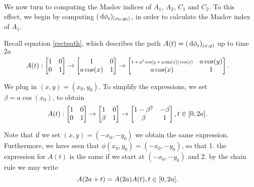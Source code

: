 We now turn to computing the Maslov indices of $A_1$, $A_2$, $C_1$ and $C_2$. To this effect, we begin by computing $(\dl \phi_t)_{(x_0,y_0)}$, in order to calculate the Maslov index of $A_1$.

Recall equation \eqref{rectpath}, which describes the path $A(t) = (\dl \phi_t)_{(x,y)}$ up to time $2a$
\begin{equation}\label{rectpath}
A(t) :
\begin{bmatrix}
1 & 0\\
0 & 1
\end{bmatrix}
\to
\begin{bmatrix}
1 & 0\\
a \cos(x) & 1
\end{bmatrix}
\to
\begin{bmatrix}
\scalebox{0.7}{$1+ a^2 \cos(y+a \sin(x)) \cos(x)$} &  a \cos(y)\\
a \cos(x) & 1
\end{bmatrix}.
\end{equation}

We plug in $(x,y) = (x_0, y_0)$. To simplify the expressions, we set $\beta = a \cos(x_0)$, to obtain
\begin{equation}
A(t) :
\begin{bmatrix}
1 & 0\\
0 & 1
\end{bmatrix}
\to
\begin{bmatrix}
1 & 0\\
\beta & 1
\end{bmatrix}
\to
\begin{bmatrix}
1 - \beta^2 &  -\beta \\
\beta & 1
\end{bmatrix}, t \in \interval 0 {2a}.
\end{equation}

Note that if we set $(x,y) = (-x_0, -y_0)$ we obtain the same expression. Furthermore, we have seen that $\phi(x_0, y_0) = (-x_0, -y_0)$, so that 1. the expression for $A(t)$ is the same if we start at $(-x_0, -y_0)$ and 2. by the chain rule we may write
\begin{equation}
A(2a + t) = A(2a) A(t), t \in \interval 0 {2a}.
\end{equation}

